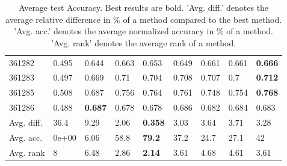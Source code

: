 \begin{table}[ht!]
\begin{tabular}{lllllllll}
  361282 & 0.495 & 0.644 & 0.663 & 0.653 & 0.649 & 0.661 & 0.661 & \textbf{0.666} \\ 
  361283 & 0.497 & 0.669 & 0.71 & 0.704 & 0.708 & 0.707 & 0.7 & \textbf{0.712} \\ 
  361285 & 0.508 & 0.687 & 0.756 & 0.764 & 0.761 & 0.748 & 0.754 & \textbf{0.768} \\ 
  361286 & 0.488 & \textbf{0.687} & 0.678 & 0.678 & 0.686 & 0.682 & 0.684 & 0.683 \\ 
   \hline
Avg. diff. & 36.4 & 9.29 & 2.06 & \textbf{0.358} & 3.03 & 3.64 & 3.71 & 3.28 \\ 
  Avg. acc. & 0e+00 & 6.06 & 58.8 & \textbf{79.2} & 37.2 & 24.7 & 27.1 & 42 \\ 
  Avg. rank & 8 & 6.48 & 2.86 & \textbf{2.14} & 3.61 & 4.68 & 4.61 & 3.61 \\ 
   \hline
\hline
\end{tabular}
\endgroup
\caption{Average test Accuracy. 
                  Best results are bold. 
                  'Avg. diff.' denotes the average relative difference in \% of a method compared to the best method.
                  'Avg. acc.' denotes the average normalized accuracy in \% of a method.
                  'Avg. rank' denotes the average rank of a method.} 
\label{TABLES/table_results_Accuracy_random_splits}
\end{table}
